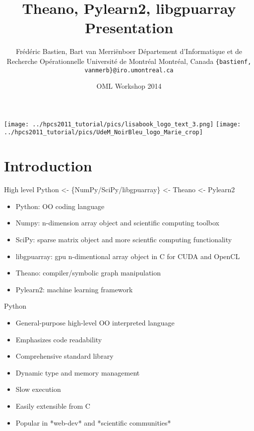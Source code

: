 \documentclass[utf8x,xcolor=pdftex,dvipsnames,table]{beamer}
\title{Theano, Pylearn2, libgpuarray Presentation}
\author{
\footnotesize
Frédéric Bastien\superscript{a}, Bart van Merriënboer\superscript{a} \newline
\superscript{a}Département d'Informatique et de Recherche Opérationnelle \newline
Université de Montréal \newline
Montréal, Canada \newline
\texttt{\{bastienf, vanmerb\}@iro.umontreal.ca} \newline \newline
}
\date{OML Workshop 2014}
\begin{document}
\begin{frame}[plain]
 \titlepage
 \vspace{-5em}
 \texttt{[image: ../hpcs2011\_tutorial/pics/lisabook\_logo\_text\_3.png]}
 \hfill
 \texttt{[image: ../hpcs2011\_tutorial/pics/UdeM\_NoirBleu\_logo\_Marie\_crop]}
\end{frame}

\section{Introduction}
\begin{frame}{High level}\setcounter{page}{1}
  Python <- \{NumPy/SciPy/libgpuarray\} <- Theano <- Pylearn2
  \begin{itemize}
  \item Python: OO coding language
  \item Numpy: n-dimension array object and scientific computing toolbox
  \item SciPy: sparse matrix object and more scientfic computing functionality
  \item libgpuarray: gpu n-dimentional array object in C for CUDA and OpenCL
  \item Theano: compiler/symbolic graph manipulation
  \item Pylearn2: machine learning framework
  \end{itemize}
\end{frame}

\begin{frame}{Python}
  \begin{itemize}
  \item General-purpose high-level OO interpreted language
  \item Emphasizes code readability
  \item Comprehensive standard library
  \item Dynamic type and memory management
  \item Slow execution
  \item Easily extensible from C
  \item Popular in *web-dev* and *scientific communities*
  \end{itemize}
\end{frame}
\end{document}
